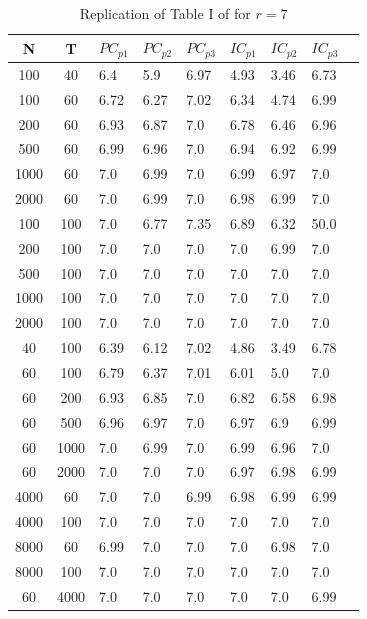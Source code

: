 \documentclass[12pt]{article}
\begin{document}
\label{bai ng information criteria}
\begin{table}[h!]
\caption{Replication of Table I of \citet{bai2002determining} for $r=7$}
 \\
\center
\begin{tabular}{cc|lllllll}

	N & T & $PC_{p1}$ & $PC_{p2}$ & $PC_{p3}$ & $IC_{p1}$ & $IC_{p2}$ & $IC_{p3}$\\
	\hline
		100 & 40 & 6.4 & 5.9 & 6.97 & 4.93 & 3.46 & 6.73 & \\ 
		100 & 60 & 6.72 & 6.27 & 7.02 & 6.34 & 4.74 & 6.99 & \\ 
		200 & 60 & 6.93 & 6.87 & 7.0 & 6.78 & 6.46 & 6.96 & \\ 
		500 & 60 & 6.99 & 6.96 & 7.0 & 6.94 & 6.92 & 6.99 & \\ 
		1000 & 60 & 7.0 & 6.99 & 7.0 & 6.99 & 6.97 & 7.0 & \\ 
		2000 & 60 & 7.0 & 6.99 & 7.0 & 6.98 & 6.99 & 7.0 & \\ 
		100 & 100 & 7.0 & 6.77 & 7.35 & 6.89 & 6.32 & 50.0 & \\ 
		200 & 100 & 7.0 & 7.0 & 7.0 & 7.0 & 6.99 & 7.0 & \\ 
		500 & 100 & 7.0 & 7.0 & 7.0 & 7.0 & 7.0 & 7.0 & \\ 
		1000 & 100 & 7.0 & 7.0 & 7.0 & 7.0 & 7.0 & 7.0 & \\ 
		2000 & 100 & 7.0 & 7.0 & 7.0 & 7.0 & 7.0 & 7.0 & \\ 
		40 & 100 & 6.39 & 6.12 & 7.02 & 4.86 & 3.49 & 6.78 & \\ 
		60 & 100 & 6.79 & 6.37 & 7.01 & 6.01 & 5.0 & 7.0 & \\ 
		60 & 200 & 6.93 & 6.85 & 7.0 & 6.82 & 6.58 & 6.98 & \\ 
		60 & 500 & 6.96 & 6.97 & 7.0 & 6.97 & 6.9 & 6.99 & \\ 
		60 & 1000 & 7.0 & 6.99 & 7.0 & 6.99 & 6.96 & 7.0 & \\ 
		60 & 2000 & 7.0 & 7.0 & 7.0 & 6.97 & 6.98 & 6.99 & \\ 
		4000 & 60 & 7.0 & 7.0 & 6.99 & 6.98 & 6.99 & 6.99 & \\ 
		4000 & 100 & 7.0 & 7.0 & 7.0 & 7.0 & 7.0 & 7.0 & \\ 
		8000 & 60 & 6.99 & 7.0 & 7.0 & 7.0 & 6.98 & 7.0 & \\ 
		8000 & 100 & 7.0 & 7.0 & 7.0 & 7.0 & 7.0 & 7.0 & \\ 
		60 & 4000 & 7.0 & 7.0 & 7.0 & 7.0 & 7.0 & 6.99 & \\ 

\end{tabular}
\end{table}
\end{document}
